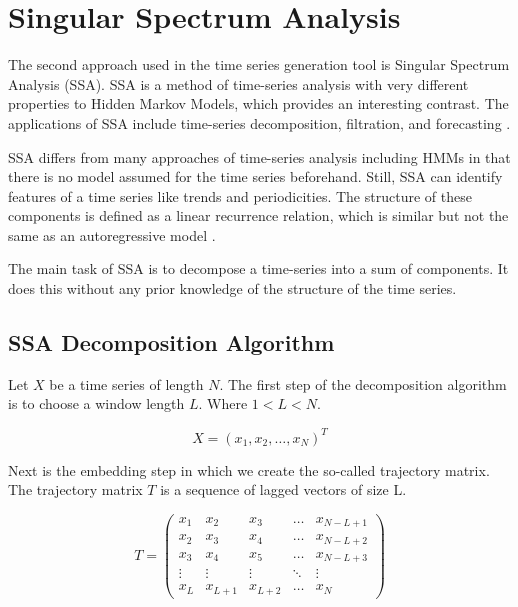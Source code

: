 
\chapter{Singular Spectrum Analysis}\label{chapter:ssa}

The second approach used in the time series generation tool is Singular Spectrum Analysis (SSA). SSA is a method of time-series analysis with very different properties to Hidden Markov Models, which provides an interesting contrast. The applications of SSA include time-series decomposition, filtration, and forecasting \parencite{golyandina2013singular}.

SSA differs from many approaches of time-series analysis including HMMs in that there is no model assumed for the time series beforehand. Still, SSA can identify features of a time series like trends and periodicities. The structure of these components is defined as a linear recurrence relation, which is similar but not the same as an autoregressive model \parencite{golyandina2014basic}.

The main task of SSA is to decompose a time-series into a sum of components. It does this without any prior knowledge of the structure of the time series. 

\section{SSA Decomposition Algorithm}

Let $X$ be a time series of length $N$. The first step of the decomposition algorithm is to choose a window length $L$. Where $1 < L < N$. 

\begin{equation}
   X = (x_1, x_2, \ldots ,x_N)^T
\end{equation}

Next is the embedding step in which we create the so-called trajectory matrix. The trajectory matrix $T$ is a sequence of lagged vectors of size L. 

\begin{equation}
   T = 
\left(\begin{array}{ccccc}
x_{1} & x_{2} & x_{3} & \dots & x_{N-L+1} \\
x_{2} & x_{3} & x_{4} & \dots & x_{N-L+2} \\
x_{3} & x_{4} & x_{5} & \dots & x_{N-L+3} \\
\vdots & \vdots & \vdots & \ddots & \vdots \\
x_{L} & x_{L+1} & x_{L+2} & \dots & x_{N}
\end{array}\right)
   \label{eq:ssa-trajectory}
\end{equation}

